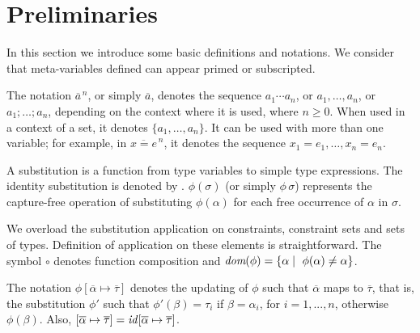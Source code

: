\section{Preliminaries}\label{prelimirares}

In this section we introduce some basic definitions and notations. We
consider that meta-variables defined can appear primed or subscripted.


The notation $\overline{a}^{\,n}$, or simply $\overline{a}$, denotes
the sequence $a_1 \cdots a_n$, or $a_1, \ldots, a_n$, or
$a_1;\ldots;a_n$, depending on the context where it is used, where
$n\geq 0$. When used in a context of a set, it denotes
$\{a_1,\ldots,a_n\}$. It can be used with more than one variable; for
example, in $\overline{x = e}^{\,n}$, it denotes the sequence
$x_1=e_1, \ldots, x_n = e_n$.

A substitution is a function from type variables to simple type
expressions. The identity substitution is denoted by
\id. $\phi(\sigma)$ (or simply $\phi\,\sigma$) represents the
capture-free operation of substituting $\phi(\alpha)$ for each free
occurrence of $\alpha$ in $\sigma$.

We overload the substitution application on constraints, constraint
sets and sets of types. Definition of application on these elements is
straightforward. The symbol $\circ$ denotes function composition and
$\textit{dom}(\phi)=\{\alpha \mid\ \phi(\alpha) \neq \alpha\}$.

The notation $\phi[\overline{\alpha}\mapsto\overline{\tau}]$ denotes
the updating of $\phi$ such that $\overline{\alpha}$ maps to
$\overline{\tau}$, that is, the substitution $\phi'$ such that
$\phi'(\beta) = \tau_i$ if $\beta = \alpha_i$, for $i = 1,...,n$,
otherwise $\phi(\beta)$. Also, $[\overline{\alpha}\mapsto\overline{\tau}]
= \text{\it id\/}[\overline{\alpha}\mapsto\overline{\tau}]$.

